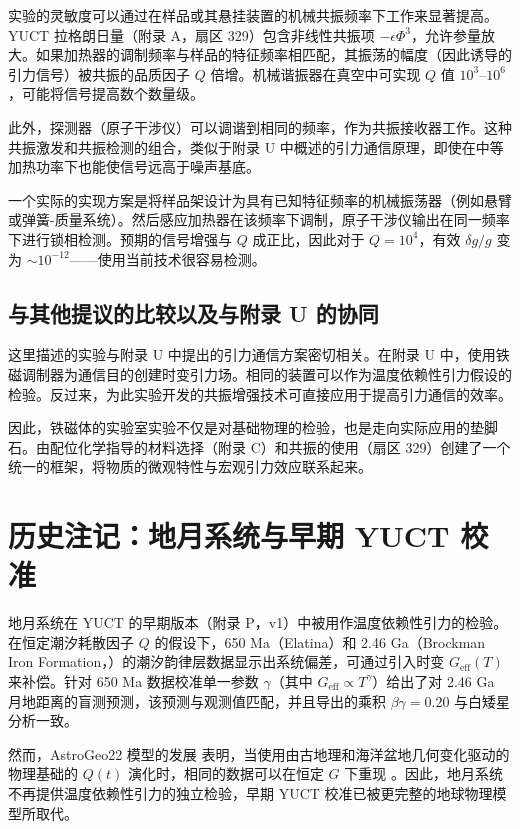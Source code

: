 \documentclass[12pt]{article}
\theoremstyle{remark}
\begin{document}
	实验的灵敏度可以通过在样品或其悬挂装置的机械共振频率下工作来显著提高。YUCT 拉格朗日量（附录 A，扇区 329）包含非线性共振项 $-\epsilon \Phi^3$，允许参量放大。如果加热器的调制频率与样品的特征频率相匹配，其振荡的幅度（因此诱导的引力信号）被共振的品质因子 $Q$ 倍增。机械谐振器在真空中可实现 $Q$ 值 $10^3$–$10^6$，可能将信号提高数个数量级。
	
	此外，探测器（原子干涉仪）可以调谐到相同的频率，作为共振接收器工作。这种共振激发和共振检测的组合，类似于附录 U 中概述的引力通信原理，即使在中等加热功率下也能使信号远高于噪声基底。
	
	一个实际的实现方案是将样品架设计为具有已知特征频率的机械振荡器（例如悬臂或弹簧-质量系统）。然后感应加热器在该频率下调制，原子干涉仪输出在同一频率下进行锁相检测。预期的信号增强与 $Q$ 成正比，因此对于 $Q = 10^4$，有效 $\delta g/g$ 变为 $\sim 10^{-12}$——使用当前技术很容易检测。
	
	\subsection{与其他提议的比较以及与附录 U 的协同}
	\label{subsec:comparison-appU}
	
	这里描述的实验与附录 U 中提出的引力通信方案密切相关。在附录 U 中，使用铁磁调制器为通信目的创建时变引力场。相同的装置可以作为温度依赖性引力假设的检验。反过来，为此实验开发的共振增强技术可直接应用于提高引力通信的效率。
	
	因此，铁磁体的实验室实验不仅是对基础物理的检验，也是走向实际应用的垫脚石。由配位化学指导的材料选择（附录 C）和共振的使用（扇区 329）创建了一个统一的框架，将物质的微观特性与宏观引力效应联系起来。
	
	\section{历史注记：地月系统与早期 YUCT 校准}
	\label{sec:earth-moon}
	
	地月系统在 YUCT 的早期版本（附录 P，v1）中被用作温度依赖性引力的检验。在恒定潮汐耗散因子 $Q$ 的假设下，650 Ma（Elatina）和 2.46 Ga（Brockman Iron Formation，\cite{Lantink2022}）的潮汐韵律层数据显示出系统偏差，可通过引入时变 $G_{\mathrm{eff}}(T)$ 来补偿。针对 650 Ma 数据校准单一参数 $\gamma$（其中 $G_{\mathrm{eff}}\propto T^{\gamma}$）给出了对 2.46 Ga 月地距离的盲测预测，该预测与观测值匹配，并且导出的乘积 $\beta\gamma = 0.20$ 与白矮星分析一致。
	
	然而，AstroGeo22 模型的发展 \cite{Farhat2022} 表明，当使用由古地理和海洋盆地几何变化驱动的物理基础的 $Q(t)$ 演化时，相同的数据可以在恒定 $G$ 下重现 \cite{Zeeden2023}。因此，地月系统不再提供温度依赖性引力的独立检验，早期 YUCT 校准已被更完整的地球物理模型所取代。
	
\end{document}
